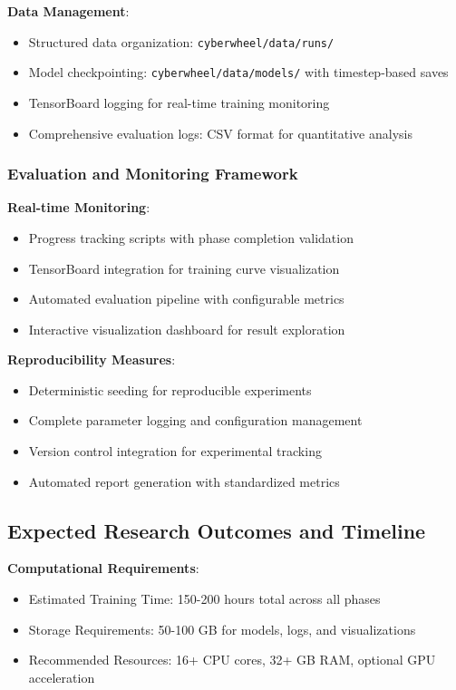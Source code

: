\documentclass[11pt]{article}
\newcounter{phase}[algorithm]
\theoremstyle{definition}
\theoremstyle{plain}
\begin{document}
\textbf{Data Management}:
\begin{itemize}
\item Structured data organization: \texttt{cyberwheel/data/runs/}
\item Model checkpointing: \texttt{cyberwheel/data/models/} with timestep-based saves
\item TensorBoard logging for real-time training monitoring
\item Comprehensive evaluation logs: CSV format for quantitative analysis
\end{itemize}

\subsubsection{Evaluation and Monitoring Framework}
\textbf{Real-time Monitoring}:
\begin{itemize}
\item Progress tracking scripts with phase completion validation
\item TensorBoard integration for training curve visualization
\item Automated evaluation pipeline with configurable metrics
\item Interactive visualization dashboard for result exploration
\end{itemize}

\textbf{Reproducibility Measures}:
\begin{itemize}
\item Deterministic seeding for reproducible experiments
\item Complete parameter logging and configuration management
\item Version control integration for experimental tracking
\item Automated report generation with standardized metrics
\end{itemize}

\subsection{Expected Research Outcomes and Timeline}

\textbf{Computational Requirements}:
\begin{itemize}
\item Estimated Training Time: 150-200 hours total across all phases
\item Storage Requirements: 50-100 GB for models, logs, and visualizations
\item Recommended Resources: 16+ CPU cores, 32+ GB RAM, optional GPU acceleration
\end{itemize}
\end{document}
